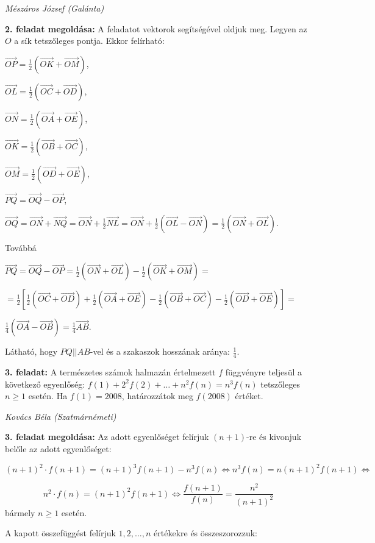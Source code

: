 \documentclass[a4paper,10pt]{article}
\def\ki#1#2{\hfill {\it #1 (#2)}\medskip}
\def\v#1#2{\overrightarrow{#1#2}}
\begin{document}
\ki{Mészáros József}{Galánta}\medskip

{\bf 2. feladat megoldása: } A feladatot vektorok segítségével oldjuk meg. Legyen az $O$ a sík
tetszőleges pontja. Ekkor felírható:

\smallskip$\displaystyle{\v OP = \frac 12\left(\v OK+\v OM\right)}$,

\smallskip$\displaystyle{\v OL = \frac 12\left(\v OC+\v OD\right)}$,

\smallskip$\displaystyle{\v ON = \frac 12\left(\v OA+\v OE\right)}$,

\smallskip$\displaystyle{\v OK = \frac 12\left(\v OB+\v OC\right)}$,

\smallskip$\displaystyle{\v OM = \frac 12\left(\v OD+\v OE\right)}$,

\smallskip$\displaystyle{\v PQ=\v OQ-\v OP}$,

\smallskip$\displaystyle{\v OQ =
\v ON + \v NQ = \v ON +\frac 12 \v NL = \v ON +
 \frac 12\left(\v OL-\v ON\right)=
 \frac 12\left(\v ON+\v OL\right)}$.

Továbbá

\smallskip$\displaystyle{\v PQ=\v OQ-\v OP=
\frac 12\left(\v ON+\v OL\right)-
\frac 12\left(\v OK+\v OM\right)=}$

\smallskip$\displaystyle{
=\frac 12
\left[
\frac 12\left(\v OC+\v OD\right)+
\frac 12\left(\v OA+\v OE\right)-
\frac 12\left(\v OB+\v OC\right)-
\frac 12\left(\v OD+\v OE\right)
\right]=}$

\smallskip$\displaystyle{\frac 14\left(\v OA-\v OB\right)=
\frac 14\v AB}$.

\smallskip
Látható, hogy $PQ||AB$-vel és a szakaszok hosszának aránya: $\frac{1}{4}$.


\medskip
{\bf 3. feladat: } A természetes számok halmazán értelmezett $f$ függvényre teljesül a következő egyenlőség: $f(1)+2^2f(2)+\dots+n^2f(n)=n^3f(n)$  tetszőleges $n\ge 1$  esetén.
Ha $f(1) = 2008$, határozzátok meg $f(2008)$ értéket.

\ki{Kovács Béla}{Szatmárnémeti}\medskip


{\bf 3. feladat megoldása: } 
Az adott egyenlőséget felírjuk $(n+1)$-re és kivonjuk belőle az adott
egyenlőséget:

$$(n + 1)^2\cdot f(n+1) = (n+1)^3f(n+1)-n^3f(n)\Leftrightarrow
n^3f(n)=n(n+1)^2f(n+1)\Leftrightarrow$$

$$n^2\cdot f(n) = (n+1)^2f(n+1)\Leftrightarrow
\frac{f(n+1)}{f(n)}
=\frac{n^2}{(n+1)^2}$$
bármely $n\ge 1$ esetén.

A kapott összefüggést felírjuk $1, 2,\dots, n$ értékekre és összeszorozzuk:
\end{document}

